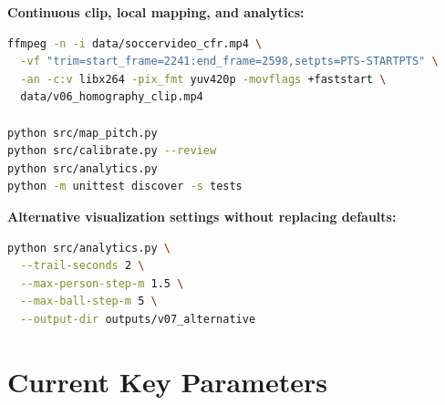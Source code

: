 \documentclass[11pt,a4paper]{article}
\begin{document}
\noindent\textbf{Continuous clip, local mapping, and analytics:}
\begin{lstlisting}[language=bash]
ffmpeg -n -i data/soccervideo_cfr.mp4 \
  -vf "trim=start_frame=2241:end_frame=2598,setpts=PTS-STARTPTS" \
  -an -c:v libx264 -pix_fmt yuv420p -movflags +faststart \
  data/v06_homography_clip.mp4

python src/map_pitch.py
python src/calibrate.py --review
python src/analytics.py
python -m unittest discover -s tests
\end{lstlisting}

\noindent\textbf{Alternative visualization settings without replacing defaults:}
\begin{lstlisting}[language=bash]
python src/analytics.py \
  --trail-seconds 2 \
  --max-person-step-m 1.5 \
  --max-ball-step-m 5 \
  --output-dir outputs/v07_alternative
\end{lstlisting}

\section{Current Key Parameters}
\end{document}
